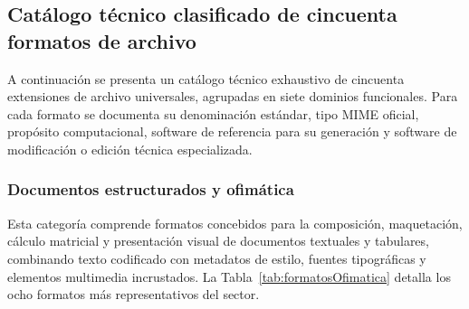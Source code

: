 \documentclass[12pt]{article}
\begin{document}
\subsection{Catálogo técnico clasificado de cincuenta formatos de archivo}
\label{subsec:catalogoCincuentaFormatos}

A continuación se presenta un catálogo técnico exhaustivo de cincuenta extensiones de archivo universales, agrupadas en siete dominios funcionales. Para cada formato se documenta su denominación estándar, tipo MIME oficial, propósito computacional, software de referencia para su generación y software de modificación o edición técnica especializada.

\subsubsection{Documentos estructurados y ofimática}
Esta categoría comprende formatos concebidos para la composición, maquetación, cálculo matricial y presentación visual de documentos textuales y tabulares, combinando texto codificado con metadatos de estilo, fuentes tipográficas y elementos multimedia incrustados. La Tabla~\ref{tab:formatosOfimatica} detalla los ocho formatos más representativos del sector.
\end{document}
